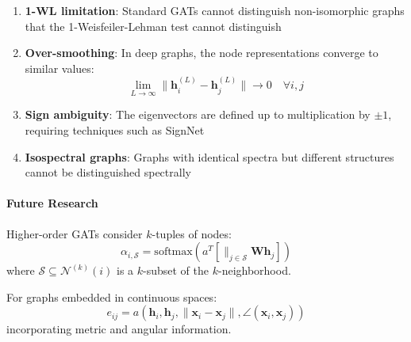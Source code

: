 \begin{enumerate}
    \item \textbf{1-WL limitation}: Standard GATs cannot distinguish non-isomorphic graphs that the 1-Weisfeiler-Lehman test cannot distinguish

    \item \textbf{Over-smoothing}: In deep graphs, the node representations converge to similar values:
    \begin{equation}
        \lim_{L \to \infty} \|\mathbf{h}_i^{(L)} - \mathbf{h}_j^{(L)}\| \to 0 \quad \forall i,j
        \label{eq:over_smoothing_limit}
    \end{equation}

    \item \textbf{Sign ambiguity}: The eigenvectors are defined up to multiplication by $\pm 1$, requiring techniques such as SignNet

    \item \textbf{Isospectral graphs}: Graphs with identical spectra but different structures cannot be distinguished spectrally
\end{enumerate}

\paragraph{Future Research}

\begin{definition}\label{def:higher_order_gat}
Higher-order GATs consider $k$-tuples of nodes:
\begin{equation}
    \alpha_{i,\mathcal{S}} = \text{softmax}\left(a^T\left[\|_{j \in \mathcal{S}} \mathbf{W}\mathbf{h}_j\right]\right)
    \label{eq:higher_order_gat}
\end{equation}
where $\mathcal{S} \subseteq \mathcal{N}^{(k)}(i)$ is a $k$-subset of the $k$-neighborhood.
\end{definition}

\begin{definition}\label{def:continuous_geometric_attention}
For graphs embedded in continuous spaces:
\begin{equation}
    e_{ij} = a(\mathbf{h}_i, \mathbf{h}_j, \|\mathbf{x}_i - \mathbf{x}_j\|, \angle(\mathbf{x}_i, \mathbf{x}_j))
    \label{eq:continuous_geometric_attention}
\end{equation}
incorporating metric and angular information.
\end{definition}

